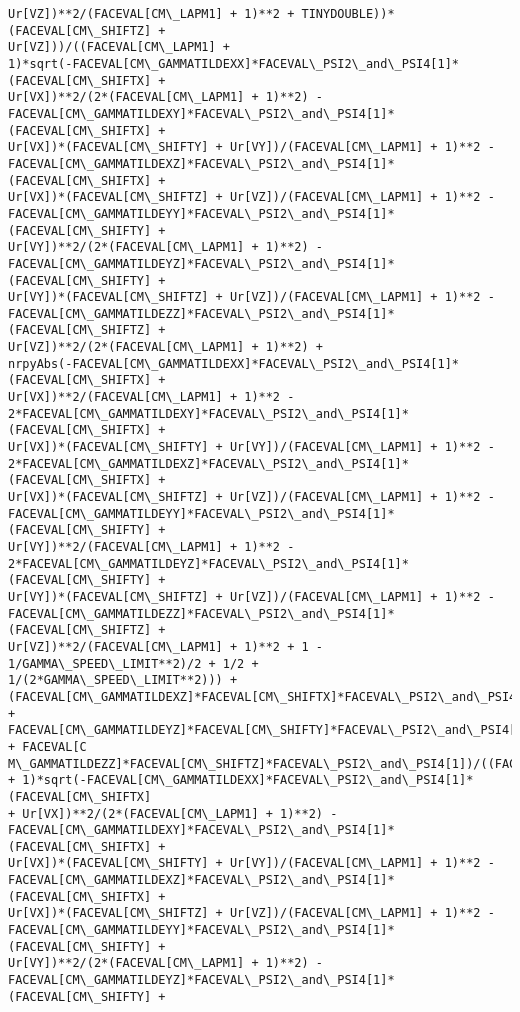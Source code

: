 \documentclass[landscape,letterpaper,10pt,english]{article}
\begin{document}
\begin{Verbatim}[commandchars=\\\{\}]
Ur[VZ])**2/(FACEVAL[CM\_LAPM1] + 1)**2 + TINYDOUBLE))*(FACEVAL[CM\_SHIFTZ] +
Ur[VZ]))/((FACEVAL[CM\_LAPM1] +
1)*sqrt(-FACEVAL[CM\_GAMMATILDEXX]*FACEVAL\_PSI2\_and\_PSI4[1]*(FACEVAL[CM\_SHIFTX] +
Ur[VX])**2/(2*(FACEVAL[CM\_LAPM1] + 1)**2) -
FACEVAL[CM\_GAMMATILDEXY]*FACEVAL\_PSI2\_and\_PSI4[1]*(FACEVAL[CM\_SHIFTX] +
Ur[VX])*(FACEVAL[CM\_SHIFTY] + Ur[VY])/(FACEVAL[CM\_LAPM1] + 1)**2 -
FACEVAL[CM\_GAMMATILDEXZ]*FACEVAL\_PSI2\_and\_PSI4[1]*(FACEVAL[CM\_SHIFTX] +
Ur[VX])*(FACEVAL[CM\_SHIFTZ] + Ur[VZ])/(FACEVAL[CM\_LAPM1] + 1)**2 -
FACEVAL[CM\_GAMMATILDEYY]*FACEVAL\_PSI2\_and\_PSI4[1]*(FACEVAL[CM\_SHIFTY] +
Ur[VY])**2/(2*(FACEVAL[CM\_LAPM1] + 1)**2) -
FACEVAL[CM\_GAMMATILDEYZ]*FACEVAL\_PSI2\_and\_PSI4[1]*(FACEVAL[CM\_SHIFTY] +
Ur[VY])*(FACEVAL[CM\_SHIFTZ] + Ur[VZ])/(FACEVAL[CM\_LAPM1] + 1)**2 -
FACEVAL[CM\_GAMMATILDEZZ]*FACEVAL\_PSI2\_and\_PSI4[1]*(FACEVAL[CM\_SHIFTZ] +
Ur[VZ])**2/(2*(FACEVAL[CM\_LAPM1] + 1)**2) +
nrpyAbs(-FACEVAL[CM\_GAMMATILDEXX]*FACEVAL\_PSI2\_and\_PSI4[1]*(FACEVAL[CM\_SHIFTX] +
Ur[VX])**2/(FACEVAL[CM\_LAPM1] + 1)**2 -
2*FACEVAL[CM\_GAMMATILDEXY]*FACEVAL\_PSI2\_and\_PSI4[1]*(FACEVAL[CM\_SHIFTX] +
Ur[VX])*(FACEVAL[CM\_SHIFTY] + Ur[VY])/(FACEVAL[CM\_LAPM1] + 1)**2 -
2*FACEVAL[CM\_GAMMATILDEXZ]*FACEVAL\_PSI2\_and\_PSI4[1]*(FACEVAL[CM\_SHIFTX] +
Ur[VX])*(FACEVAL[CM\_SHIFTZ] + Ur[VZ])/(FACEVAL[CM\_LAPM1] + 1)**2 -
FACEVAL[CM\_GAMMATILDEYY]*FACEVAL\_PSI2\_and\_PSI4[1]*(FACEVAL[CM\_SHIFTY] +
Ur[VY])**2/(FACEVAL[CM\_LAPM1] + 1)**2 -
2*FACEVAL[CM\_GAMMATILDEYZ]*FACEVAL\_PSI2\_and\_PSI4[1]*(FACEVAL[CM\_SHIFTY] +
Ur[VY])*(FACEVAL[CM\_SHIFTZ] + Ur[VZ])/(FACEVAL[CM\_LAPM1] + 1)**2 -
FACEVAL[CM\_GAMMATILDEZZ]*FACEVAL\_PSI2\_and\_PSI4[1]*(FACEVAL[CM\_SHIFTZ] +
Ur[VZ])**2/(FACEVAL[CM\_LAPM1] + 1)**2 + 1 - 1/GAMMA\_SPEED\_LIMIT**2)/2 + 1/2 +
1/(2*GAMMA\_SPEED\_LIMIT**2))) +
(FACEVAL[CM\_GAMMATILDEXZ]*FACEVAL[CM\_SHIFTX]*FACEVAL\_PSI2\_and\_PSI4[1] +
FACEVAL[CM\_GAMMATILDEYZ]*FACEVAL[CM\_SHIFTY]*FACEVAL\_PSI2\_and\_PSI4[1] + FACEVAL[C
M\_GAMMATILDEZZ]*FACEVAL[CM\_SHIFTZ]*FACEVAL\_PSI2\_and\_PSI4[1])/((FACEVAL[CM\_LAPM1]
+ 1)*sqrt(-FACEVAL[CM\_GAMMATILDEXX]*FACEVAL\_PSI2\_and\_PSI4[1]*(FACEVAL[CM\_SHIFTX]
+ Ur[VX])**2/(2*(FACEVAL[CM\_LAPM1] + 1)**2) -
FACEVAL[CM\_GAMMATILDEXY]*FACEVAL\_PSI2\_and\_PSI4[1]*(FACEVAL[CM\_SHIFTX] +
Ur[VX])*(FACEVAL[CM\_SHIFTY] + Ur[VY])/(FACEVAL[CM\_LAPM1] + 1)**2 -
FACEVAL[CM\_GAMMATILDEXZ]*FACEVAL\_PSI2\_and\_PSI4[1]*(FACEVAL[CM\_SHIFTX] +
Ur[VX])*(FACEVAL[CM\_SHIFTZ] + Ur[VZ])/(FACEVAL[CM\_LAPM1] + 1)**2 -
FACEVAL[CM\_GAMMATILDEYY]*FACEVAL\_PSI2\_and\_PSI4[1]*(FACEVAL[CM\_SHIFTY] +
Ur[VY])**2/(2*(FACEVAL[CM\_LAPM1] + 1)**2) -
FACEVAL[CM\_GAMMATILDEYZ]*FACEVAL\_PSI2\_and\_PSI4[1]*(FACEVAL[CM\_SHIFTY] +

\end{Verbatim}
\end{document}
